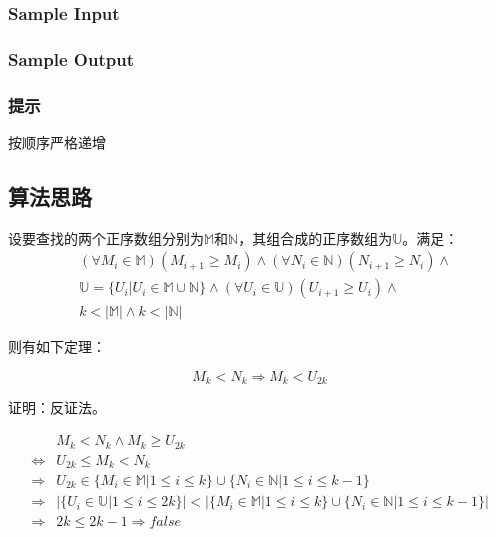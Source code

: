 \subsubsection*{Sample Input}








\subsubsection*{Sample Output}



\subsubsection*{提示}



按顺序严格递增



\subsection{算法思路}

设要查找的两个正序数组分别为$\mathbb M$和$\mathbb N$，其组合成的正序数组为$\mathbb U$。满足：
$$
\begin{aligned}
    &(\forall M_i\in\mathbb M)(M_{i+1}\geq M_i)\wedge(\forall N_i\in\mathbb N)(N_{i+1}\geq N_i)\wedge\\
    &\mathbb U=\{U_i|U_i\in\mathbb M\cup\mathbb N\}\wedge(\forall U_i\in\mathbb U)(U_{i+1}\geq U_i)\wedge\\
    &k<|\mathbb M|\wedge k<|\mathbb N|
\end{aligned}
$$

则有如下定理：

$$
M_k<N_k\Rightarrow M_k<U_{2k}
$$

证明：反证法。

$$
\begin{aligned}
    &M_k<N_k\wedge M_k\geq U_{2k}\\
    \Leftrightarrow& U_{2k}\leq M_k<N_k\\
    \Rightarrow& U_{2k}\in\{M_i\in\mathbb{M}|1\leq i\leq k\}\cup\{N_i\in\mathbb{N}|1\leq i\leq k-1\}\\
    \Rightarrow &|\{U_i\in\mathbb{U}|1\leq i\leq 2k\}|<|\{M_i\in\mathbb{M}|1\leq i\leq k\}\cup\{N_i\in\mathbb{N}|1\leq i\leq k-1\}|\\
    \Rightarrow &2k\leq 2k-1\Rightarrow false\\
\end{aligned}
$$

